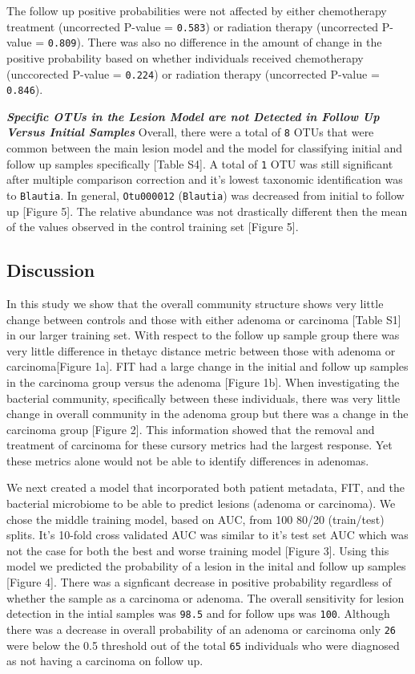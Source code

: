 \documentclass[12pt,]{article}
\begin{document}
The follow up positive probabilities were not affected by either
chemotherapy treatment (uncorrected P-value = \texttt{0.583}) or
radiation therapy (uncorrected P-value = \texttt{0.809}). There was also
no difference in the amount of change in the positive probability based
on whether individuals received chemotherapy (unccorected P-value =
\texttt{0.224}) or radiation therapy (uncorrected P-value =
\texttt{0.846}).

\textbf{\emph{Specific OTUs in the Lesion Model are not Detected in
Follow Up Versus Initial Samples}} Overall, there were a total of
\texttt{8} OTUs that were common between the main lesion model and the
model for classifying initial and follow up samples specifically
{[}Table S4{]}. A total of \texttt{1} OTU was still significant after
multiple comparison correction and it's lowest taxonomic identification
was to \texttt{Blautia}. In general, \texttt{Otu000012}
(\texttt{Blautia}) was decreased from initial to follow up {[}Figure
5{]}. The relative abundance was not drastically different then the mean
of the values observed in the control training set {[}Figure 5{]}.

\newpage

\subsection{Discussion}\label{discussion}

In this study we show that the overall community structure shows very
little change between controls and those with either adenoma or
carcinoma {[}Table S1{]} in our larger training set. With respect to the
follow up sample group there was very little difference in thetayc
distance metric between those with adenoma or carcinoma{[}Figure 1a{]}.
FIT had a large change in the initial and follow up samples in the
carcinoma group versus the adenoma {[}Figure 1b{]}. When investigating
the bacterial community, specifically between these individuals, there
was very little change in overall community in the adenoma group but
there was a change in the carcinoma group {[}Figure 2{]}. This
information showed that the removal and treatment of carcinoma for these
cursory metrics had the largest response. Yet these metrics alone would
not be able to identify differences in adenomas.

We next created a model that incorporated both patient metadata, FIT,
and the bacterial microbiome to be able to predict lesions (adenoma or
carcinoma). We chose the middle training model, based on AUC, from 100
80/20 (train/test) splits. It's 10-fold cross validated AUC was similar
to it's test set AUC which was not the case for both the best and worse
training model {[}Figure 3{]}. Using this model we predicted the
probability of a lesion in the inital and follow up samples {[}Figure
4{]}. There was a signficant decrease in positive probability regardless
of whether the sample as a carcinoma or adenoma. The overall sensitivity
for lesion detection in the intial samples was \texttt{98.5} and for
follow ups was \texttt{100}. Although there was a decrease in overall
probability of an adenoma or carcinoma only \texttt{26} were below the
0.5 threshold out of the total \texttt{65} individuals who were
diagnosed as not having a carcinoma on follow up.
\end{document}
